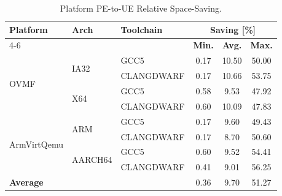 \begin{table}
  \centering
  \begin{tabular}{l l l c c c}
    \toprule
    \multirow{2}{*}[-2pt]{\textbf{Platform}} & \multirow{2}{*}[-2pt]{\textbf{Arch}} & \multirow{2}{*}[-2pt]{\textbf{Toolchain}} & \multicolumn{3}{c}{\textbf{Saving} [\%]}\\
    \cmidrule{4-6}
     & & & \textbf{Min.} & \textbf{Avg.} & \textbf{Max.}\\
    \midrule
    \multirow{4}{*}[-2pt]{\gls{OVMF}} & \multirow{2}{*}{IA32} & GCC5 & 0.17 & 10.50 & 50.00\\
     & & CLANGDWARF & 0.17 & 10.66 & 53.75\\
    \cmidrule{2-6}
     & \multirow{2}{*}{X64} & GCC5 & 0.58 & 9.53 & 47.92\\
     & & CLANGDWARF & 0.60 & 10.09 & 47.83\\
    \midrule
    \multirow{4}{*}[-2pt]{\gls{ArmVirtQemu}} & \multirow{2}{*}{ARM} & GCC5 & 0.17 & 9.60 & 49.43\\
     & & CLANGDWARF & 0.17 & 8.70 & 50.60\\
    \cmidrule{2-6}
     & \multirow{2}{*}{AARCH64} & GCC5 & 0.60 & 9.52 & 54.41\\
     & & CLANGDWARF & 0.41 & 9.01 & 56.25\\
    \midrule
    \midrule
    \textbf{Average} & & & 0.36 & 9.70 & 51.27\\
    \bottomrule
  \end{tabular}
  \caption{Platform PE-to-UE Relative Space-Saving.}
\end{table}
